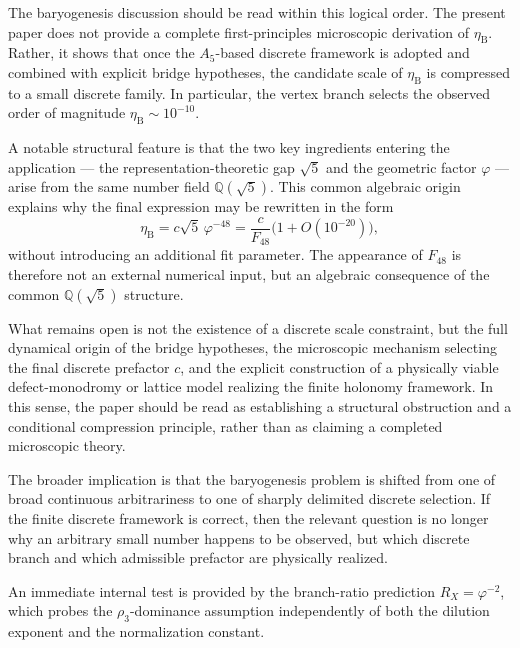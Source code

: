 \documentclass[sn-mathphys-num,Numbered]{sn-jnl}
\theoremstyle{thmstyleone}
\theoremstyle{thmstylethree}
\theoremstyle{thmstyletwo}
\newcommand{\etaB}{\eta_{\mathrm{B}}}
\newcommand{\Qsqrt}{\mathbb{Q}(\sqrt{5})}
\begin{document}
The baryogenesis discussion should be read within this logical order.
The present paper does not provide a complete first-principles
microscopic derivation of $\etaB$. Rather, it shows that once the
$A_5$-based discrete framework is adopted and combined with explicit
bridge hypotheses, the candidate scale of $\etaB$ is compressed to a
small discrete family. In particular, the vertex branch selects the
observed order of magnitude $\etaB\sim10^{-10}$.

A notable structural feature is that the two key ingredients entering
the application --- the representation-theoretic gap $\sqrt{5}$ and the
geometric factor $\varphi$ --- arise from the same number field
$\Qsqrt$. This common algebraic origin explains why the final
expression may be rewritten in the form
\[
\etaB = c\sqrt{5}\,\varphi^{-48}
       = \frac{c}{F_{48}}\bigl(1+O(10^{-20})\bigr),
\]
without introducing an additional fit parameter. The appearance of
$F_{48}$ is therefore not an external numerical input, but an algebraic
consequence of the common $\Qsqrt$ structure.

What remains open is not the existence of a discrete scale constraint,
but the full dynamical origin of the bridge hypotheses, the microscopic
mechanism selecting the final discrete prefactor $c$, and the explicit
construction of a physically viable defect-monodromy or lattice model
realizing the finite holonomy framework. In this sense, the paper should
be read as establishing a structural obstruction and a conditional
compression principle, rather than as claiming a completed microscopic
theory.

The broader implication is that the baryogenesis problem is shifted from
one of broad continuous arbitrariness to one of sharply delimited
discrete selection. If the finite discrete framework is correct, then
the relevant question is no longer why an arbitrary small number happens
to be observed, but which discrete branch and which admissible
prefactor are physically realized.

An immediate internal test is provided by the branch-ratio prediction
$R_X=\varphi^{-2}$, which probes the $\rho_3$-dominance assumption
independently of both the dilution exponent and the normalization
constant.

\backmatter

\end{document}
